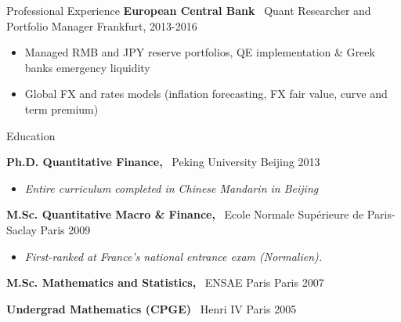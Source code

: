 \documentclass[usegeometry, 10pt, a4paper]{cv} %
\newcommand{\activite}[1]{\textbf{#1}\ }
\begin{document}
\begin{rubriquetableau}[0.95\textwidth]{Professional Experience}
\activite{European Central Bank} Quant Researcher and Portfolio Manager \hfill Frankfurt, 2013-2016 \\
\vspace{-0.2cm}

\begin{itemize}[]
  \item Managed RMB and JPY reserve portfolios, QE implementation \& Greek banks emergency liquidity
  \item Global FX and rates models (inflation forecasting, FX fair value, curve and term premium)
\end{itemize}
\end{rubriquetableau}

\begin{rubriquetableau}[0.95\textwidth]{Education}\\
  \vspace{-0.5cm}
  
  \activite{Ph.D. Quantitative Finance,} Peking University \hfill Beijing 2013\\ 
\vspace{-0.5cm}  
  \begin{itemize}[label={},
    rightmargin=\dimexpr\linewidth-13cm-\leftmargin\relax]
  \item \small{\emph{Entire curriculum completed in Chinese Mandarin in Beijing}}
  \end{itemize}
  
  \vspace{0.2cm}
  
  \activite{M.Sc. Quantitative Macro \& Finance,} Ecole Normale Supérieure de Paris-Saclay \hfill Paris 2009\\
  \vspace{-0.5cm}
  \begin{itemize}[label={}, rightmargin=\dimexpr\linewidth-13cm-\leftmargin\relax]
  \item \small{\emph{First-ranked at France's national entrance exam (Normalien).}}
  \end{itemize}

  \vspace{0.2cm}


  \activite{M.Sc. Mathematics and Statistics,} ENSAE Paris \hfill Paris 2007\\
  \vspace{0.2cm}

  \activite{Undergrad Mathematics (CPGE)} Henri IV \hfill Paris 2005\\
  \end{rubriquetableau}
\end{document}
